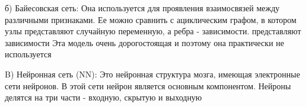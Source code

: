 б) Байесовская сеть: Она используется для проявления взаимосвязей между
различными признаками. Ее можно сравнить с ациклическим графом, в котором узлы
представляют случайную переменную, а ребра - зависимости. представляют
зависимости Эта модель очень дорогостоящая и поэтому она практически не
используется~\cite{article18}


B) Нейронная сеть (NN): Это нейронная структура мозга, имеющая электронные сети
нейронов. В этой сети нейрон является основным компонентом. Нейроны делятся на
три части - входную, скрытую и выходную~\cite{article18}
